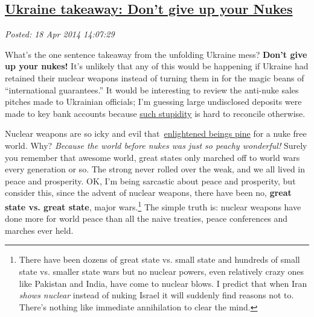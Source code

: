 %

\subsection*{\href{https://bakerjd99.wordpress.com/2014/04/18/ukraine-takeaway-dont-give-up-your-nukes/}{Ukraine takeaway: Don't give up your Nukes}}


\noindent\emph{Posted: 18 Apr 2014 14:07:29}
\vspace{6pt}

What's the one sentence takeaway from the unfolding Ukraine mess?
\textbf{Don't give up your nukes!} It's unlikely that any of
this would be happening if Ukraine had retained their nuclear weapons
instead of turning them in for the magic beans of ``international
guarantees.'' It would be interesting to review the anti-nuke sales
pitches made to Ukrainian officials; I'm guessing large undisclosed
deposits were made to key bank accounts because
\href{http://www.slate.com/blogs/the\_world\_/2014/03/19/the\_budapest\_memorandum\_in\_1994\_russia\_agreed\_to\_respect\_ukraine\_s\_borders.html}{such
stupidity} is hard to reconcile otherwise.

Nuclear weapons are so icky and evil
that~\href{http://blogs.telegraph.co.uk/news/nilegardiner/100002371/is-obama-the-most-naive-president-in-us-history/}{enlightened
beings pine} for a nuke free world. Why? \emph{Because the world before
nukes was just so peachy wonderful!} Surely you remember that awesome
world, great states only marched off to world wars every generation or
so. The strong never rolled over the weak, and we all lived in peace and
prosperity. OK, I'm being sarcastic about peace and prosperity, but
consider this, since the advent of nuclear weapons, there have been no,
\textbf{great state vs. great state}, major wars.\footnote{
There have been dozens of great state vs. small state and
hundreds of small state vs. smaller state wars but no nuclear powers,
even relatively crazy ones like Pakistan and India, have come to nuclear
blows. I predict that when Iran \emph{shows nuclear} instead of nuking
Israel it will suddenly find reasons not to. There's nothing like
immediate annihilation to clear the mind.
} 
 The simple
truth is: nuclear weapons have done more for world peace than all the
naive treaties, peace conferences and marches ever held.


